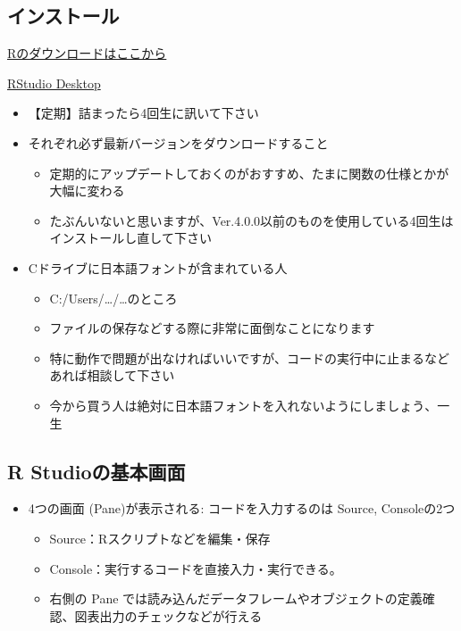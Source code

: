 \documentclass[
]{ltjsarticle}
\providecommand{\tightlist}{%
  \setlength{\itemsep}{0pt}\setlength{\parskip}{0pt}}
\begin{document}
\hypertarget{ux30a4ux30f3ux30b9ux30c8ux30fcux30eb}{%
\subsection{インストール}\label{ux30a4ux30f3ux30b9ux30c8ux30fcux30eb}}

\href{https://cran.ism.ac.jp/}{Rのダウンロードはここから}

\href{https://www.rstudio.com/products/rstudio/download/\#download}{RStudio
Desktop}

\begin{itemize}
\tightlist
\item
  【定期】詰まったら4回生に訊いて下さい
\item
  それぞれ必ず最新バージョンをダウンロードすること

  \begin{itemize}
  \tightlist
  \item
    定期的にアップデートしておくのがおすすめ、たまに関数の仕様とかが大幅に変わる
  \item
    たぶんいないと思いますが、Ver.4.0.0以前のものを使用している4回生はインストールし直して下さい
  \end{itemize}
\item
  Cドライブに日本語フォントが含まれている人

  \begin{itemize}
  \tightlist
  \item
    C:/Users/\ldots/\ldots のところ
  \item
    ファイルの保存などする際に非常に面倒なことになります
  \item
    特に動作で問題が出なければいいですが、コードの実行中に止まるなどあれば相談して下さい
  \item
    今から買う人は絶対に日本語フォントを入れないようにしましょう、一生
  \end{itemize}
\end{itemize}

\hypertarget{r-studioux306eux57faux672cux753bux9762}{%
\subsection{R
Studioの基本画面}\label{r-studioux306eux57faux672cux753bux9762}}

\begin{itemize}
\tightlist
\item
  4つの画面 (Pane)が表示される: コードを入力するのは Source,
  Consoleの2つ

  \begin{itemize}
  \tightlist
  \item
    Source：Rスクリプトなどを編集・保存
  \item
    Console：実行するコードを直接入力・実行できる。
  \item
    右側の Pane
    では読み込んだデータフレームやオブジェクトの定義確認、図表出力のチェックなどが行える
  \end{itemize}
\end{itemize}
\end{document}
